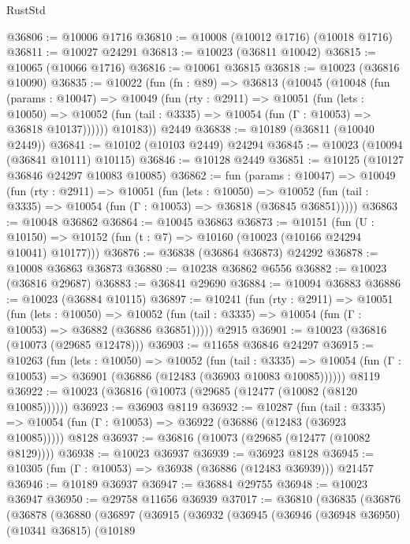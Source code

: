 \begin{lexlean}{RustStd}
\begin{coremodule}
@36806 := @10006 @1716
@36810 := @10008 (@10012 @1716) (@10018 @1716)
@36811 := @10027 @24291
@36813 := @10023 (@36811 @10042)
@36815 := @10065 (@10066 @1716)
@36816 := @10061 @36815
@36818 := @10023 (@36816 @10090)
@36835 := @10022
    (fun (fn : @89) =>
    @36813
      (@10045
        (@10048
          (fun (params : @10047) =>
          @10049
            (fun (rty : @2911) =>
            @10051
              (fun (lets : @10050) =>
              @10052 (fun (tail : @3335) => @10054 (fun (Γ : @10053) => @36818 @10137))))))
        @10183))
    @2449
@36838 := @10189 (@36811 (@10040 @2449))
@36841 := @10102 (@10103 @2449) @24294
@36845 := @10023 (@10094 (@36841 @10111) @10115)
@36846 := @10128 @2449
@36851 := @10125 (@10127 @36846 @24297 @10083 @10085)
@36862 := fun (params : @10047) =>
  @10049
    (fun (rty : @2911) =>
    @10051
      (fun (lets : @10050) =>
      @10052 (fun (tail : @3335) => @10054 (fun (Γ : @10053) => @36818 (@36845 @36851)))))
@36863 := @10048 @36862
@36864 := @10045 @36863
@36873 := @10151
    (fun (U : @10150) => @10152 (fun (t : @7) => @10160 (@10023 (@10166 @24294 @10041) @10177)))
@36876 := @36838 (@36864 @36873) @24292
@36878 := @10008 @36863 @36873
@36880 := @10238 @36862 @6556
@36882 := @10023 (@36816 @29687)
@36883 := @36841 @29690
@36884 := @10094 @36883
@36886 := @10023 (@36884 @10115)
@36897 := @10241
    (fun (rty : @2911) =>
    @10051
      (fun (lets : @10050) =>
      @10052 (fun (tail : @3335) => @10054 (fun (Γ : @10053) => @36882 (@36886 @36851)))))
    @2915
@36901 := @10023 (@36816 (@10073 (@29685 @12478)))
@36903 := @11658 @36846 @24297
@36915 := @10263
    (fun (lets : @10050) =>
    @10052
      (fun (tail : @3335) =>
      @10054 (fun (Γ : @10053) => @36901 (@36886 (@12483 (@36903 @10083 @10085))))))
    @8119
@36922 := @10023 (@36816 (@10073 (@29685 (@12477 (@10082 (@8120 @10085))))))
@36923 := @36903 @8119
@36932 := @10287
    (fun (tail : @3335) => @10054 (fun (Γ : @10053) => @36922 (@36886 (@12483 (@36923 @10085)))))
    @8128
@36937 := @36816 (@10073 (@29685 (@12477 (@10082 @8129))))
@36938 := @10023 @36937
@36939 := @36923 @8128
@36945 := @10305 (fun (Γ : @10053) => @36938 (@36886 (@12483 @36939))) @21457
@36946 := @10189 @36937
@36947 := @36884 @29755
@36948 := @10023 @36947
@36950 := @29758 @11656 @36939
@37017 := @36810
    (@36835
      (@36876
        (@36878
          (@36880
            (@36897
              (@36915
                (@36932
                  (@36945
                    (@36946
                      (@36948 @36950)
                      (@10341 @36815)
                      (@10189

\end{coremodule}
\end{lexlean}
